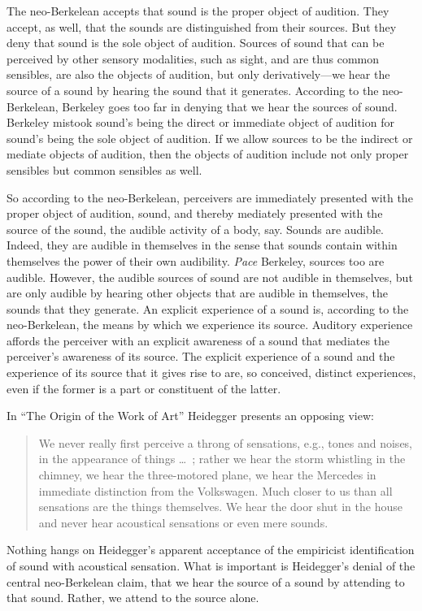 The neo-Berkelean accepts that sound is the proper object of audition. They accept, as well, that the sounds are distinguished from their sources. But they deny that sound is the sole object of audition. Sources of sound that can be perceived by other sensory modalities, such as sight, and are thus common sensibles, are also the objects of audition, but only derivatively---we hear the source of a sound by hearing the sound that it generates. According to the neo-Berkelean, Berkeley goes too far in denying that we hear the sources of sound. Berkeley mistook sound's being the direct or immediate object of audition for sound's being the sole object of audition. If we allow sources to be the indirect or mediate objects of audition, then the objects of audition include not only proper sensibles but common sensibles as well.

So according to the neo-Berkelean, perceivers are immediately presented with the proper object of audition, sound, and thereby mediately presented with the source of the sound, the audible activity of a body, say. Sounds are audible. Indeed, they are audible in themselves in the sense that sounds contain within themselves the power of their own audibility. \emph{Pace} Berkeley, sources too are audible. However, the audible sources of sound are not audible in themselves, but are only audible by hearing other objects that are audible in themselves, the sounds that they generate. An explicit experience of a sound is, according to the neo-Berkelean, the means by which we experience its source.  Auditory experience affords the perceiver with an explicit awareness of a sound that mediates the perceiver's awareness of its source. The explicit experience of a sound and the experience of its source that it gives rise to are, so conceived, distinct experiences, even if the former is a part or constituent of the latter.

In ``The Origin of the Work of Art'' Heidegger presents an opposing view:
\begin{quote}
    We never really first perceive a throng of sensations, e.g., tones and noises, in the appearance of things \ldots\ ; rather we hear the storm whistling in the chimney, we hear the three-motored plane, we hear the Mercedes in immediate distinction from the Volkswagen. Much closer to us than all sensations are the things themselves. We hear the door shut in the house and never hear acoustical sensations or even mere sounds. \citep[151--152]{Heidegger:1935uq}
\end{quote}
Nothing hangs on Heidegger's apparent acceptance of the empiricist identification of sound with acoustical sensation. What is important is Heidegger's denial of the central neo-Berkelean claim, that we hear the source of a sound by attending to that sound. Rather, we attend to the source alone. 

